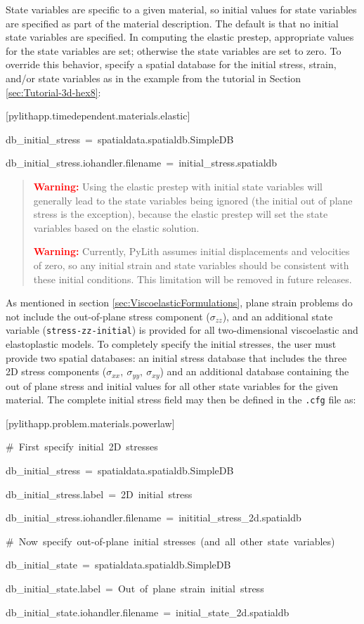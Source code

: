 State variables are specific to a given material, so initial values
for state variables are specified as part of the material description.
The default is that no initial state variables are specified. In computing
the elastic prestep, appropriate values for the state variables are
set; otherwise the state variables are set to zero. To override this
behavior, specify a spatial database for the initial stress, strain,
and/or state variables as in the example from the tutorial in Section
\vref{sec:Tutorial-3d-hex8}:
\begin{lyxcode}
{[}pylithapp.timedependent.materials.elastic{]}

db\_initial\_stress~=~spatialdata.spatialdb.SimpleDB

db\_initial\_stress.iohandler.filename~=~initial\_stress.spatialdb\end{lyxcode}
\begin{quote}
\textbf{\textcolor{red}{Warning:}}\textbf{ }Using the elastic prestep
with initial state variables will generally lead to the state variables
being ignored (the initial out of plane stress is the exception),
because the elastic prestep will set the state variables based on
the elastic solution.

\textbf{\textcolor{red}{Warning:}}\textbf{ }Currently, PyLith assumes
initial displacements and velocities of zero, so any initial strain
and state variables should be consistent with these initial conditions.
This limitation will be removed in future releases.
\end{quote}
As mentioned in section \vref{sec:ViscoelasticFormulations}, plane
strain problems do not include the out-of-plane stress component ($\sigma_{zz}$),
and an additional state variable (\texttt{stress-zz-initial}) is provided
for all two-dimensional viscoelastic and elastoplastic models. To
completely specify the initial stresses, the user must provide two
spatial databases: an initial stress database that includes the three
2D stress components ($\sigma_{xx},\:\sigma_{yy},\:\sigma_{xy}$)
and an additional database containing the out of plane stress and
initial values for all other state variables for the given material.
The complete initial stress field may then be defined in the \texttt{.cfg}
file as:
\begin{lyxcode}
{[}pylithapp.problem.materials.powerlaw{]}

\#~First~specify~initial~2D~stresses

db\_initial\_stress~=~spatialdata.spatialdb.SimpleDB

db\_initial\_stress.label~=~2D~initial~stress

db\_initial\_stress.iohandler.filename~=~inititial\_stress\_2d.spatialdb



\#~Now~specify~out-of-plane~initial~stresses~(and~all~other~state~variables)

db\_initial\_state~=~spatialdata.spatialdb.SimpleDB

db\_initial\_state.label~=~Out~of~plane~strain~initial~stress

db\_initial\_state.iohandler.filename~=~initial\_state\_2d.spatialdb
\end{lyxcode}
